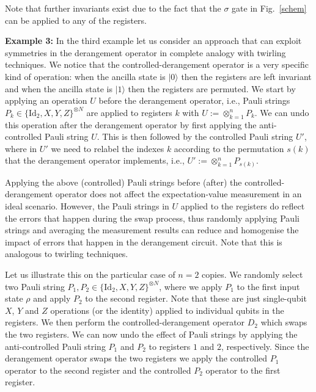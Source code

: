 \documentclass[aps,prx,showpacs,twocolumn,reprint]{revtex4-2}
\begin{document}
{Note that further invariants exist due to the fact that the $\sigma$ gate in Fig.~\ref{schem} can be applied
to any of the registers.


\textbf{Example 3:}	
In the third example let us consider an approach that can exploit symmetries in the derangement operator
in complete analogy with twirling techniques.
We notice that the controlled-derangement operator is a very
specific kind of operation: when the ancilla state is $|0\rangle$ then the registers are left invariant
and when the ancilla state is $|1\rangle$ then the registers are permuted.
We start by applying an operation $U$ before the derangement
operator, i.e., Pauli strings $P_k \in \{ \mathrm{Id}_2, X, Y, Z\}^{\otimes N}$ are applied to registers $k$
with  $U:= \otimes_{k=1}^n P_k$.
We can undo this operation after the derangement operator by first applying the anti-controlled Pauli string $U$.
This is then followed by the controlled Pauli string $U'$, where
in $U'$ we need to relabel the indexes $k$ according to the permutation $s(k)$ that the derangement
operator implements, i.e., $U':= \otimes_{k=1}^n P_{s(k)}$.



Applying the above (controlled) Pauli strings before (after) the controlled-derangement operator
does not affect the expectation-value measurement in an ideal scenario.
However, the Pauli strings in $U$ applied to the registers do reflect the errors that happen during the swap process,
thus randomly applying Pauli strings and averaging the measurement results can reduce and homogenise
the impact of errors that happen in the derangement circuit. Note that this is analogous to twirling techniques.



Let us illustrate this on the particular case of $n=2$ copies.
We randomly select two Pauli string $P_1,P_2 \in \{ \mathrm{Id}_2, X, Y, Z\}^{\otimes N}$,
where we apply $P_1$ to the first input state $\rho$ and apply $P_2$ to the second register.
Note that these are just single-qubit $X$, $Y$ and $Z$ operations (or the identity) applied
to individual qubits in the registers.
We then perform the controlled-derangement operator $D_2$ which swaps the two registers.
We can now undo the effect of Pauli strings by applying the anti-controlled Pauli string $P_1$ and
$P_2$ to registers $1$ and $2$, respectively. Since the derangement operator
swaps the two registers we apply the controlled $P_1$ operator to the second register and
the controlled $P_2$ operator to the first register.


}
\end{document}
